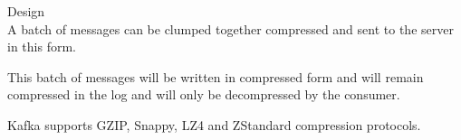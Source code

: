 \begin{frame}[plain,t]{Design} %
     \\
    \vspace{2ex}
    A batch of messages can be clumped together compressed and sent to the server in this form. 
    
    \vspace{2ex}
    This batch of messages will be written in compressed form and will remain compressed in the log and will only be decompressed by the consumer.
    
    \vspace{2ex}
    Kafka supports GZIP, Snappy, LZ4 and ZStandard compression protocols.
    
    
\end{frame}

